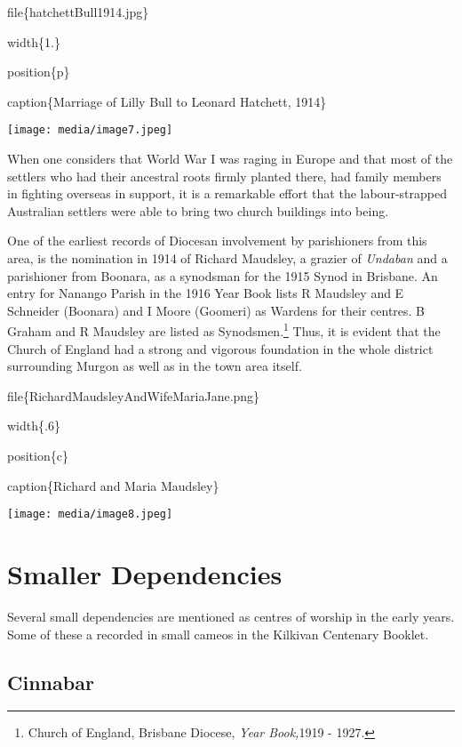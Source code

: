 file\{hatchettBull1914.jpg\}

width\{1.\}

position\{p\}

caption\{Marriage of Lilly Bull to Leonard Hatchett, 1914\}

\texttt{[image: media/image7.jpeg]}

When one considers that World War I was raging in Europe and that most of the settlers who had their ancestral roots firmly planted there, had family members in fighting overseas in support, it is a remarkable effort that the labour-strapped Australian settlers were able to bring two church buildings into being.

One of the earliest records of Diocesan involvement by parishioners from this area, is the nomination in 1914 of Richard Maudsley, a grazier of \emph{Undaban} and a parishioner from Boonara, as a synodsman for the 1915 Synod in Brisbane. An entry for Nanango Parish in the 1916 Year Book lists R Maudsley and E Schneider (Boonara) and I Moore (Goomeri) as Wardens for their centres. B Graham and R Maudsley are listed as Synodsmen.\footnote{Church of England, Brisbane Diocese, \emph{Year Book,}1919 - 1927.} Thus, it is evident that the Church of England had a strong and vigorous foundation in the whole district surrounding Murgon as well as in the town area itself.

file\{RichardMaudsleyAndWifeMariaJane.png\}

width\{.6\}

position\{c\}

caption\{Richard and Maria Maudsley\}

\texttt{[image: media/image8.jpeg]}

\hypertarget{smaller-dependencies}{%
\section{Smaller Dependencies}\label{smaller-dependencies}}

Several small dependencies are mentioned as centres of worship in the early years. Some of these a recorded in small cameos in the Kilkivan Centenary Booklet.

\hypertarget{cinnabar}{%
\subsection{Cinnabar}\label{cinnabar}}

